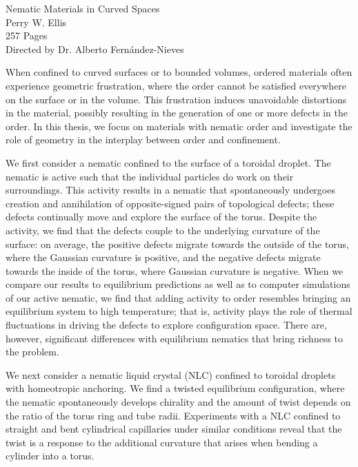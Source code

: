 \documentclass[11pt]{article}   %
\begin{document}
\onehalfspacing
\begin{centering}
Nematic Materials in Curved Spaces \\[11 pt]

Perry W. Ellis \\[11 pt]

257 Pages \\[11 pt]

Directed by Dr. Alberto Fern\'andez-Nieves \\[22 pt]
\end{centering}
When confined to curved surfaces or to bounded volumes, ordered materials often experience geometric frustration, where the order cannot be satisfied everywhere on the surface or in the volume.
This frustration induces unavoidable distortions in the material, possibly resulting in the generation of one or more defects in the order.
In this thesis, we focus on materials with nematic order and investigate the role of geometry in the interplay between order and confinement.

We first consider a nematic confined to the surface of a toroidal droplet.
The nematic is active such that the individual particles do work on their surroundings.
This activity results in a nematic that spontaneously undergoes creation and annihilation of opposite-signed pairs of topological defects; these defects continually move and explore the surface of the torus.
Despite the activity, we find that the defects couple to the underlying curvature of the surface: on average, the positive defects migrate towards the outside of the torus, where the Gaussian curvature is positive, and the negative defects migrate towards the inside of the torus, where Gaussian curvature is negative.
When we compare our results to equilibrium predictions as well as to computer simulations of our active nematic, we find that adding activity to order resembles bringing an equilibrium system to high temperature; that is, activity plays the role of thermal fluctuations in driving the defects to explore configuration space.
There are, however, significant differences with equilibrium nematics that bring richness to the problem.

We next consider a nematic liquid crystal (NLC) confined to toroidal droplets with homeotropic anchoring.
We find a twisted equilibrium configuration, where the nematic spontaneously develops chirality and the amount of twist depends on the ratio of the torus ring and tube radii.
Experiments with a NLC confined to straight and bent cylindrical capillaries under similar conditions reveal that the twist is a response to the additional curvature that arises when bending a cylinder into a torus.
\end{document}

